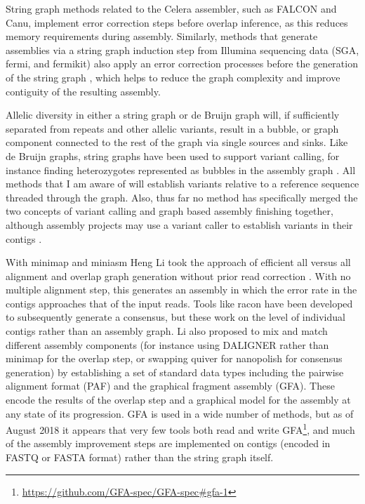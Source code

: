 String graph methods related to the Celera assembler, such as FALCON and Canu, implement error correction steps before overlap inference, as this reduces memory requirements during assembly.
Similarly, methods that generate assemblies via a string graph induction step from Illumina sequencing data (SGA, fermi, and fermikit) also apply an error correction processes before the generation of the string graph \cite{simpson2012efficient,simpson2014exploring,li2015fermikit}, which helps to reduce the graph complexity and improve contiguity of the resulting assembly.

Allelic diversity in either a string graph or de Bruijn graph will, if sufficiently separated from repeats and other allelic variants, result in a bubble, or graph component connected to the rest of the graph via single sources and sinks.
Like de Bruijn graphs, string graphs have been used to support variant calling, for instance finding heterozygotes represented as bubbles in the assembly graph \cite{li2012exploring}.
All methods that I am aware of will establish variants relative to a reference sequence threaded through the graph.
Also, thus far no method has specifically merged the two concepts of variant calling and graph based assembly finishing together, although assembly projects may use a variant caller to establish variants in their contigs \cite{jain2018nanopore,schmid2018pushing}.

With minimap and miniasm Heng Li took the approach of efficient all versus all alignment and overlap graph generation without prior read correction \cite{li2016minimap}.
With no multiple alignment step, this generates an assembly in which the error rate in the contigs approaches that of the input reads.
Tools like racon \cite{vaser2017fast} have been developed to subsequently generate a consensus, but these work on the level of individual contigs rather than an assembly graph.
Li \cite{li2016minimap} also proposed to mix and match different assembly components (for instance using DALIGNER \cite{myers2014efficient} rather than minimap for the overlap step, or swapping quiver for nanopolish for consensus generation) by establishing a set of standard data types including the pairwise alignment format (PAF) and the graphical fragment assembly (GFA).
These encode the results of the overlap step and a graphical model for the assembly at any state of its progression.
GFA is used in a wide number of methods, but as of August 2018 it appears that very few tools both read and write GFA\footnote{\url{https://github.com/GFA-spec/GFA-spec\#gfa-1}}, and much of the assembly improvement steps are implemented on contigs (encoded in FASTQ or FASTA format) rather than the string graph itself.

